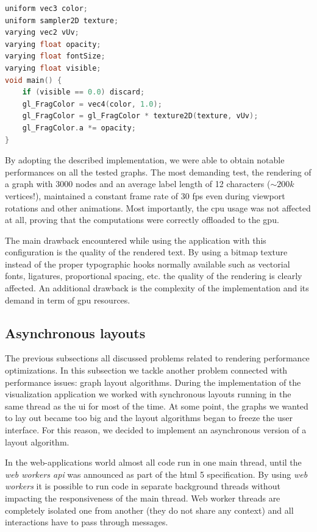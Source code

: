\minipage{\textwidth}
\begin{lstlisting}[caption={Fragment shader for paint each face with the correct character.},label=lst:label-fragment,language=c]
uniform vec3 color;
uniform sampler2D texture;
varying vec2 vUv;
varying float opacity;
varying float fontSize;
varying float visible;
void main() {
    if (visible == 0.0) discard;
    gl_FragColor = vec4(color, 1.0);
    gl_FragColor = gl_FragColor * texture2D(texture, vUv);
    gl_FragColor.a *= opacity;
}
\end{lstlisting}
\endminipage

By adopting the described implementation, we were able to obtain notable performances on all the tested graphs. The most demanding test, the rendering of a graph with 3000 nodes and an average label length of 12 characters ($\sim200k$ vertices!), maintained a constant frame rate of 30 fps even during viewport rotations and other animations. Most importantly, the \gls{cpu} usage was not affected at all, proving that the computations were correctly offloaded to the \gls{gpu}.

The main drawback encountered while using the application with this configuration is the quality of the rendered text. By using a bitmap texture instead of the proper typographic hooks normally available such as vectorial fonts, ligatures, proportional spacing, etc. the quality of the rendering is clearly affected. An additional drawback is the complexity of the implementation and its demand in term of \gls{gpu} resources.

\subsection{Asynchronous layouts}

The previous subsections all discussed problems related to rendering performance optimizations. In this subsection we tackle another problem connected with performance issues: graph layout algorithms. During the implementation of the visualization application we worked with synchronous layouts running in the same thread as the \gls{ui} for most of the time. At some point, the graphs we wanted to lay out became too big and the layout algorithms began to freeze the user interface. For this reason, we decided to implement an asynchronous version of a layout algorithm.

In the web-applications world almost all code run in one main thread, until the \emph{web workers \gls{api}} was announced as part of the \gls{html} 5 specification. By using \emph{web workers} it is possible to run code in separate background threads without impacting the responsiveness of the main thread. Web worker threads are completely isolated one from another (they do not share any context) and all interactions have to pass through messages.

